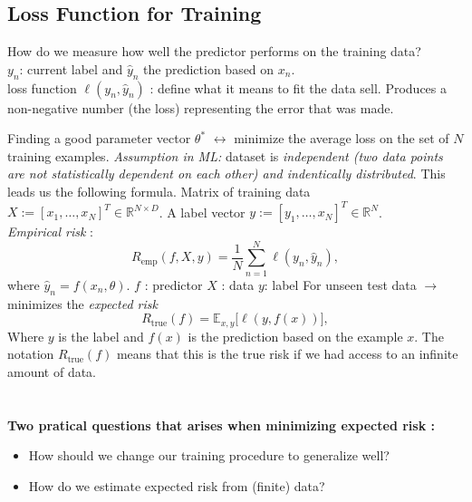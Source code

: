 \subsection{Loss Function for Training}
How do we measure how well the predictor performs on the training data?\\
$y_n$: current label and $\hat{y}_n$ the prediction based on $x_n$. \\
loss function  $\ell (y_n,\hat{y}_n)$ : define what it means to fit the data sell. Produces a non-negative number (the loss) representing the error that was made. 

Finding a good parameter vector $\theta^{*}$ $\leftrightarrow$ minimize the average loss on the set of $N$ training examples.
\textit{Assumption in ML:} dataset is \textit{independent (two data points are not statistically dependent on each other) and indentically distributed}. This leads us the following formula.
Matrix of training data $X := [x_1,\dots,x_N]^T \in \mathbb{R}^{N \times D}$. A label vector $ y := [y_1,\dots,x_N]^T \in \mathbb{R} ^N$. \\ 
\textit{Empirical risk} : 
\[
R_{\text{emp}}(f,X,y) = \frac{1}{N} \sum_{n=1}^{N} \ell (y_n, \hat{y}_n), \tag{8.6}
\]
where $\hat{y}_n = f(x_n, \theta)$.
$f$ : predictor
$X$ : data
$y$: label
For unseen test data $\rightarrow$ minimizes the \textit{expected risk}
\begin{equation}
	R_{\text{true}}(f) = \mathbb{E}_{x,y}\big[ \ell(y, f(x)) \big],
	\tag{8.10}
\end{equation}
Where $y$ is the label and $f(x)$ is the prediction based on the example $x$.
The notation $R_{\text{true}}(f)$ means that this is the true risk if we had access to an infinite amount of data.\\ \\ \\
\textbf{Two pratical questions that arises when minimizing expected risk :}
\begin{itemize}
	\item How should we change our training procedure to generalize well?
	\item How do we estimate expected risk from (finite) data?
\end{itemize}
